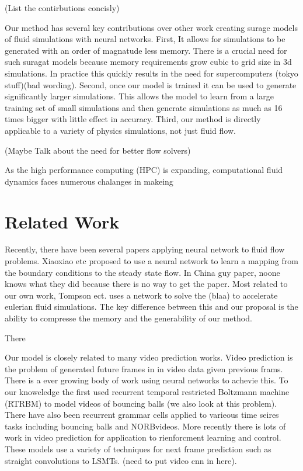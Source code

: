 \documentclass{article}
\begin{document}
(List the contirbutions concisly)

Our method has several key contributions over other work creating surage models of fluid simulations with neural networks. First, It allows for simulations to be generated with an order of magnatude less memory. There is a crucial need for such suragat models because memory requirements grow cubic to grid size in 3d simulations. In practice this quickly results in the need for supercomputers (tokyo stuff)(bad wording). Second, once our model is trained it can be used to generate significantly larger simulations. This allows the model to learn from a large training set of small simulations and then generate simulations as much as 16 times bigger with little effect in accuracy. Third, our method is directly applicable to a variety of physics simulations, not just fluid flow.

(Maybe Talk about the need for better flow solvers)

As the high performance computing (HPC) is expanding, computational fluid dynamics faces numerous chalanges in makeing 


\section{Related Work}

Recently, there have been several papers applying neural network to fluid flow problems. Xiaoxiao etc \cite{guo2016convolutional} proposed to use a neural network to learn a mapping from the boundary conditions to the steady state flow. In China guy paper, noone knows what they did because there is no way to get the paper. Most related to our own work, Tompson ect. \cite{tompson2016accelerating} uses a network to solve the (blaa) to accelerate eulerian fluid simulations. The key difference between this and our proposal is the ability to compresse the memory and the generability of our method.

There

Our model is closely related to many video prediction works. Video prediction is the problem of generated future frames in in video data given previous frams. There is a ever growing body of work using neural networks to achevie this. To our knoweledge the first used recurrent temporal restricted Boltzmann machine (RTRBM) to model videos of bouncing balls (we also look at this problem). There have also been recurrent grammar cells applied to varieous time seires tasks including bouncing balls and NORBvideos. More recently there is lots of work in video prediction for application to rienforcment learning and control. These models use a variety of techniques for next frame prediction such as straight convolutions  to LSMTs. (need to put video cnn in here).
\end{document}
